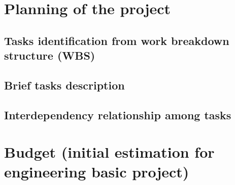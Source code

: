 \documentclass[12pt, titlepage]{scrartcl}
\begin{document}
\section{Planning of the project}

\subsection{Tasks identification from work breakdown structure (WBS)}


\subsection{Brief tasks description}


\subsection{Interdependency relationship among tasks}


%


\section{Budget (initial estimation for engineering basic project)}


\pagebreak
%
%
\end{document}
